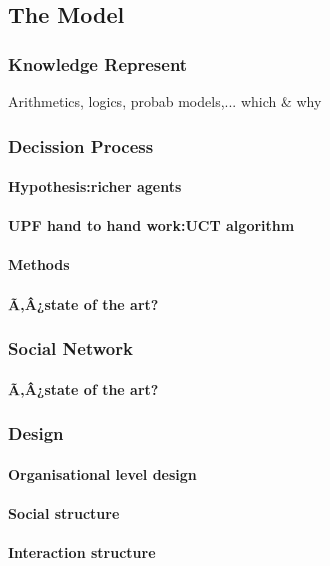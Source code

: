\documentclass[11pt,oneside,a4paper,openright]{report}
\begin{document}
		\subsection{The Model}
			\subsubsection{Knowledge Represent}
				Arithmetics, logics, probab models,... which \& why

			\subsubsection{Decission Process}
				\paragraph{Hypothesis:richer agents}
				\paragraph{UPF hand to hand work:UCT algorithm}
				\paragraph{Methods}
				\paragraph{Ã‚Â¿state of the art?}

			\subsubsection{Social Network}
				\paragraph{Ã‚Â¿state of the art?}

			\subsubsection{Design}
				\paragraph{Organisational level design}
				\paragraph{Social structure}
				\paragraph{Interaction structure}
\end{document}
